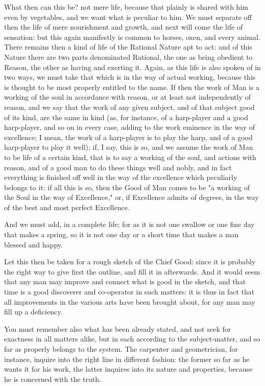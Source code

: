 What then can this be? not mere life, because that plainly is shared
with him even by vegetables, and we want what is peculiar to him. We
must separate off then the life of mere nourishment and growth, and next
will come the life of sensation: but this again manifestly is common to
horses, oxen, and every animal. There remains then a kind of life of
the Rational Nature apt to act: and of this Nature there are two parts
denominated Rational, the one as being obedient to Reason, the other as
having and exerting it. Again, as this life is also spoken of in two
ways, we must take that which is in the way of actual working, because
this is thought to be most properly entitled to the name. If then the
work of Man is a working of the soul in accordance with reason, or at
least not independently of reason, and we say that the work of any given
subject, and of that subject good of its kind, are the same in kind (as,
for instance, of a harp-player and a good harp-player, and so on in
every case, adding to the work eminence in the way of excellence; I
mean, the work of a harp-player is to play the harp, and of a good
harp-player to play it well); if, I say, this is so, and we assume the
work of Man to be life of a certain kind, that is to say a working of
the soul, and actions with reason, and of a good man to do these things
well and nobly, and in fact everything is finished off well in the way
of the excellence which peculiarly belongs to it: if all this is so,
then the Good of Man comes to be "a working of the Soul in the way of
Excellence," or, if Excellence admits of degrees, in the way of the best
and most perfect Excellence.

And we must add, in a complete life; for as it is not one swallow or one
fine day that makes a spring, so it is not one day or a short time that
makes a man blessed and happy.

Let this then be taken for a rough sketch of the Chief Good: since it
is probably the right way to give first the outline, and fill it in
afterwards. And it would seem that any man may improve and connect
what is good in the sketch, and that time is a good discoverer and
co-operator in such matters: it is thus in fact that all improvements
in the various arts have been brought about, for any man may fill up a
deficiency.

You must remember also what has been already stated, and not seek
for exactness in all matters alike, but in each according to the
subject-matter, and so far as properly belongs to the system. The
carpenter and geometrician, for instance, inquire into the right line in
different fashion: the former so far as he wants it for his work, the
latter inquires into its nature and properties, because he is concerned
with the truth.

